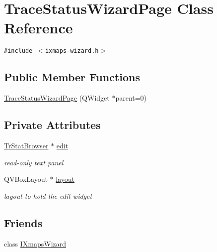 \hypertarget{classTraceStatusWizardPage}{
\section{TraceStatusWizardPage Class Reference}
\label{classTraceStatusWizardPage}
}
{\tt \#include $<$ixmaps-wizard.h$>$}

\subsection*{Public Member Functions}
\begin{CompactItemize}
\item 
\hyperlink{classTraceStatusWizardPage_5910e8f90a653ebf176478d196f4d0a5}{TraceStatusWizardPage} (QWidget $\ast$parent=0)
\end{CompactItemize}
\subsection*{Private Attributes}
\begin{CompactItemize}
\item 
\hypertarget{classTraceStatusWizardPage_c2f5a9c7335a0e455344b98adea91d7f}{
\hyperlink{classTrStatBrowser}{TrStatBrowser} $\ast$ \hyperlink{classTraceStatusWizardPage_c2f5a9c7335a0e455344b98adea91d7f}{edit}}
\label{classTraceStatusWizardPage_c2f5a9c7335a0e455344b98adea91d7f}

\begin{CompactList}\small\item\em read-only text panel \item\end{CompactList}\item 
\hypertarget{classTraceStatusWizardPage_b1c206d77463787a2ee37c3f1bd7c223}{
QVBoxLayout $\ast$ \hyperlink{classTraceStatusWizardPage_b1c206d77463787a2ee37c3f1bd7c223}{layout}}
\label{classTraceStatusWizardPage_b1c206d77463787a2ee37c3f1bd7c223}

\begin{CompactList}\small\item\em layout to hold the edit widget \item\end{CompactList}\end{CompactItemize}
\subsection*{Friends}
\begin{CompactItemize}
\item 
\hypertarget{classTraceStatusWizardPage_d62a26a0af746c34a19cd066f6dabd22}{
class \hyperlink{classTraceStatusWizardPage_d62a26a0af746c34a19cd066f6dabd22}{IXmapsWizard}}
\label{classTraceStatusWizardPage_d62a26a0af746c34a19cd066f6dabd22}

\end{CompactItemize}


